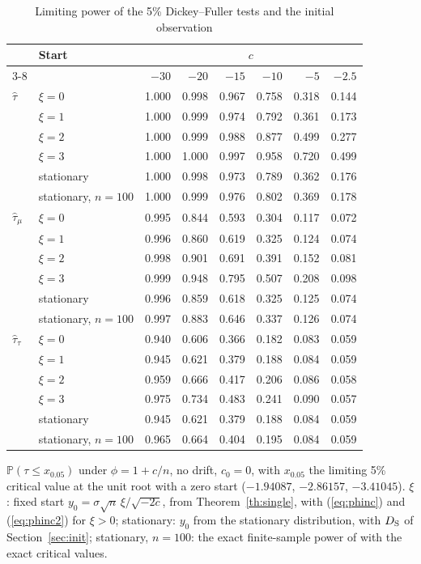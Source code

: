 \documentclass[ecta,nameyear,final]{econsocart}
\newcommand{\PP}{{\mathbb P}}
\theoremstyle{plain}
\theoremstyle{definition}
\begin{document}
\begin{table}[tbp]
\caption{Limiting power of the 5\% Dickey--Fuller tests and the initial observation}
\label{tab:init}
\begin{center}
\small
\setlength{\tabcolsep}{5pt}
\begin{tabular}{llrrrrrr}
\toprule
 & Start & \multicolumn{6}{c}{$c$}\\
\cmidrule(lr){3-8}
 & & $-30$ & $-20$ & $-15$ & $-10$ & $-5$ & $-2.5$\\
\midrule
$\hat\tau$ & $\xi=0$ & 1.000 & 0.998 & 0.967 & 0.758 & 0.318 & 0.144 \\
 & $\xi=1$ & 1.000 & 0.999 & 0.974 & 0.792 & 0.361 & 0.173 \\
 & $\xi=2$ & 1.000 & 0.999 & 0.988 & 0.877 & 0.499 & 0.277 \\
 & $\xi=3$ & 1.000 & 1.000 & 0.997 & 0.958 & 0.720 & 0.499 \\
 & stationary & 1.000 & 0.998 & 0.973 & 0.789 & 0.362 & 0.176 \\
 & stationary, $n=100$ & 1.000 & 0.999 & 0.976 & 0.802 & 0.369 & 0.178 \\[0.4ex]
$\hat\tau_\mu$ & $\xi=0$ & 0.995 & 0.844 & 0.593 & 0.304 & 0.117 & 0.072 \\
 & $\xi=1$ & 0.996 & 0.860 & 0.619 & 0.325 & 0.124 & 0.074 \\
 & $\xi=2$ & 0.998 & 0.901 & 0.691 & 0.391 & 0.152 & 0.081 \\
 & $\xi=3$ & 0.999 & 0.948 & 0.795 & 0.507 & 0.208 & 0.098 \\
 & stationary & 0.996 & 0.859 & 0.618 & 0.325 & 0.125 & 0.074 \\
 & stationary, $n=100$ & 0.997 & 0.883 & 0.646 & 0.337 & 0.126 & 0.074 \\[0.4ex]
$\hat\tau_\tau$ & $\xi=0$ & 0.940 & 0.606 & 0.366 & 0.182 & 0.083 & 0.059 \\
 & $\xi=1$ & 0.945 & 0.621 & 0.379 & 0.188 & 0.084 & 0.059 \\
 & $\xi=2$ & 0.959 & 0.666 & 0.417 & 0.206 & 0.086 & 0.058 \\
 & $\xi=3$ & 0.975 & 0.734 & 0.483 & 0.241 & 0.090 & 0.057 \\
 & stationary & 0.945 & 0.621 & 0.379 & 0.188 & 0.084 & 0.059 \\
 & stationary, $n=100$ & 0.965 & 0.664 & 0.404 & 0.195 & 0.084 & 0.059 \\
\bottomrule
\end{tabular}
\end{center}
{\small $\PP(\tau\le x_{0.05})$ under $\phi=1+c/n$, no drift, $c_0=0$, with $x_{0.05}$ the limiting 5\% critical value at the unit root with a zero start ($-1.94087$, $-2.86157$, $-3.41045$).  $\xi$: fixed start $y_0=\sigma\sqrt n\,\xi/\sqrt{-2c}$, from Theorem~\ref{th:single}, with (\ref{eq:phinc}) and (\ref{eq:phinc2}) for $\xi>0$; stationary: $y_0$ from the stationary distribution, with $D_{\rm S}$ of Section~\ref{sec:init}; stationary, $n=100$: the exact finite-sample power of \cite{BaoBrodaKan2026} with the exact critical values.}
\end{table}
\end{document}
